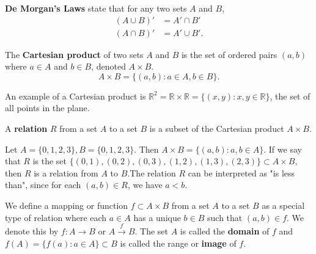 \documentclass{article}
\newcommand{\R}{\mathbb{R}}
\begin{document}
\begin{definition}
  \textbf{De Morgan's Laws} state that for any two sets $A$ and $B$,
  \begin{align*}
    (A\cup B)' &= A' \cap B' \\
    (A\cap B)' &= A' \cup B'.
  \end{align*}
\end{definition}
\begin{definition}
  The \textbf{Cartesian product} of two sets $A$ and $B$ is the set of ordered pairs $(a,b)$ where $a\in A$ and $b\in B$, denoted $A\times B$.
  \[A\times B=\{(a,b):a\in A, b\in B\}.\]
\end{definition}
An example of a Cartesian product is $\R^2=\R\times \R=\{(x,y):x,y\in \R\}$, the set of all points in the plane.
\begin{definition}
  A \textbf{relation} $R$ from a set $A$ to a set $B$ is a subset of the Cartesian product $A\times B$.
\end{definition}
\begin{example}
  Let $A=\{0, 1, 2, 3\}, B=\{0, 1, 2, 3\}$. Then $A\times B=\{(a,b):a,b\in A\}$. If we say that $R$ is the set $\{(0, 1), (0, 2), (0, 3), (1, 2), (1, 3), (2, 3)\}\subset A\times B$, then $R$ is a relation from $A$ to $B$.The relation $R$ can be interpreted as "is less than", since for each $(a,b)\in R$, we have $a<b$.
\end{example}
\begin{definition}
  We define a mapping or function $f\subset A\times B$ from a set $A$ to a set $B$ as a special type of relation where each $a\in A$ has a unique $b\in B$ such that $(a,b)\in f$. We denote this by $f:A\to B$ or $A\xrightarrow{f}B$.
  The set $A$ is called the \textbf{domain} of $f$ and $f(A)=\{f(a):a\in A\}\subset B$ is called the range or \textbf{image} of $f$.
\end{definition}
\end{document}
